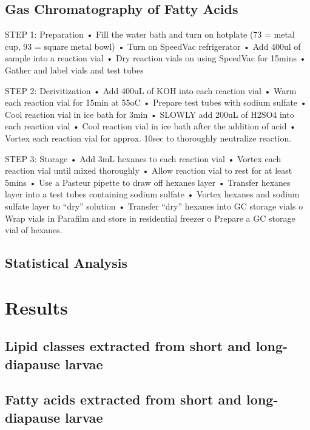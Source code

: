 \documentclass[review]{elsarticle}
\begin{document}
\subsection{Gas Chromatography of Fatty Acids}
STEP 1: Preparation
•	Fill the water bath and turn on hotplate (73 = metal cup, 93 = square metal bowl)
•	Turn on SpeedVac refrigerator 
•	Add 400ul of sample into a reaction vial
•	Dry reaction vials on using SpeedVac for 15mins
•	Gather and label vials and test tubes

STEP 2: Derivitization
•	Add 400uL of KOH into each reaction vial
•	Warm each reaction vial for 15min at 55oC
•	Prepare test tubes with sodium sulfate
•	Cool  reaction vial in ice bath for 3min
•	SLOWLY add 200uL of H2SO4 into each reaction vial 
•	Cool reaction vial in ice bath after the addition of acid
•	Vortex each reaction vial for approx. 10sec to thoroughly neutralize reaction.

STEP 3: Storage
•	Add 3mL hexanes to each reaction vial
•	Vortex each reaction vial until mixed thoroughly
•	Allow reaction vial to rest for at least 5mins
•	Use a Pasteur pipette to draw off hexanes layer
•	Transfer hexanes layer into a test tubes containing sodium sulfate
•	Vortex hexanes and sodium sulfate layer to “dry” solution
•	Transfer “dry” hexanes into GC storage vials
o	Wrap vials in Parafilm and store in residential freezer
o	Prepare a GC storage vial of hexanes.

\subsection{Statistical Analysis}

\section{Results}
\subsection{Lipid classes extracted from short and long-diapause larvae}

\subsection{Fatty acids extracted from short and long-diapause larvae}
\end{document}
